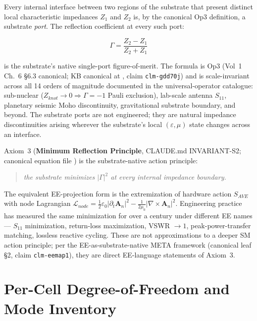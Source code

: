 Every internal interface between two regions of the substrate that present distinct local characteristic impedances $Z_1$ and $Z_2$ is, by the canonical Op3 definition, a substrate \emph{port}. The reflection coefficient at every such port:

\begin{equation}
\Gamma = \frac{Z_2 - Z_1}{Z_2 + Z_1}
\label{eq:vol9_universal_gamma}
\end{equation}

is the substrate's native single-port figure-of-merit. The formula is Op3 (Vol~1 Ch.~6 \S 6.3 canonical; KB canonical at , claim \texttt{clm-gdd70j}) and is scale-invariant across all 14 orders of magnitude documented in the universal-operator catalogue: sub-nuclear ($Z_{knot} \to 0 \Rightarrow \Gamma = -1$\gammaundeclared{} Pauli exclusion), lab-scale antenna $S_{11}$, planetary seismic Moho discontinuity, gravitational substrate boundary, and beyond. The substrate ports are not engineered; they are natural impedance discontinuities arising wherever the substrate's local $(\varepsilon, \mu)$ state changes across an interface.

Axiom~3 (\textbf{Minimum Reflection Principle}, CLAUDE.md INVARIANT-S2; canonical equation file ) is the substrate-native action principle:

\begin{quote}
\emph{the substrate minimizes $|\Gamma|^2$ at every internal impedance boundary.}
\end{quote}

The equivalent EE-projection form is the extremization of hardware action $S_{AVE}$ with node Lagrangian $\mathcal{L}_{node} = \tfrac{1}{2}\varepsilon_0|\partial_t\mathbf{A}_n|^2 - \tfrac{1}{2\mu_0}|\nabla\times\mathbf{A}_n|^2$. Engineering practice has measured the same minimization for over a century under different EE names --- $S_{11}$ minimization, return-loss maximization, VSWR $\to 1$, peak-power-transfer matching, lossless reactive cycling. These are not approximations to a deeper SM action principle; per the EE-as-substrate-native META framework (canonical leaf  \S 2, claim \texttt{clm-eemap1}), they are direct EE-language statements of Axiom~3.

\section{Per-Cell Degree-of-Freedom and Mode Inventory}
\label{sec:vol9_per_cell_dof_mode}

